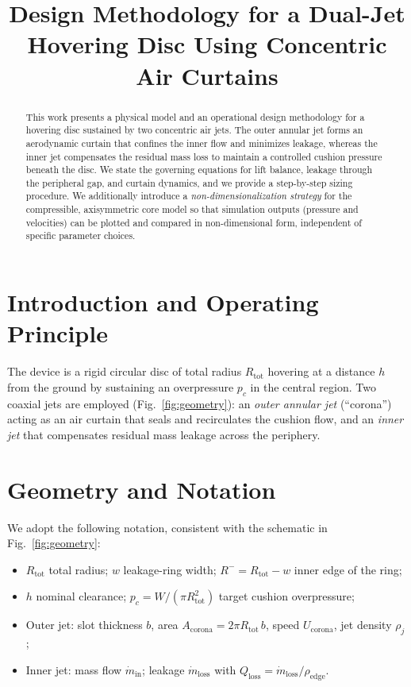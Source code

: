 \documentclass[11pt,a4paper]{article}
\title{Design Methodology for a Dual-Jet Hovering Disc Using Concentric Air Curtains}
\author{ }
\date{ }
\begin{document}
\maketitle

\begin{abstract}
This work presents a physical model and an operational design methodology for a hovering disc sustained by two concentric air jets.
The outer annular jet forms an aerodynamic curtain that confines the inner flow and minimizes leakage, whereas the inner jet compensates the residual mass loss to maintain a controlled cushion pressure beneath the disc. We state the governing equations for lift balance, leakage through the peripheral gap, and curtain dynamics, and we provide a step-by-step sizing procedure. We additionally introduce a \emph{non-dimensionalization strategy} for the compressible, axisymmetric core model so that simulation outputs (pressure and velocities) can be plotted and compared in non-dimensional form, independent of specific parameter choices.
\end{abstract}

\section{Introduction and Operating Principle}
The device is a rigid circular disc of total radius $R_{\text{tot}}$ hovering at a distance $h$ from the ground by sustaining an overpressure $p_c$ in the central region. Two coaxial jets are employed (Fig.~\ref{fig:geometry}): an \emph{outer annular jet} (``corona'') acting as an air curtain that seals and recirculates the cushion flow, and an \emph{inner jet} that compensates residual mass leakage across the periphery.

\section{Geometry and Notation}
We adopt the following notation, consistent with the schematic in Fig.~\ref{fig:geometry}:
\begin{itemize}
  \item $R_{\text{tot}}$ total radius; $w$ leakage-ring width; $R^-=R_{\text{tot}}-w$ inner edge of the ring;
  \item $h$ nominal clearance; $p_c=W/(\pi R_{\text{tot}}^2)$ target cushion overpressure;
  \item Outer jet: slot thickness $b$, area $A_\mathrm{corona}=2\pi R_{\text{tot}}\,b$, speed $U_\mathrm{corona}$, jet density $\rho_j$;
  \item Inner jet: mass flow $\dot m_\mathrm{in}$; leakage $\dot m_\mathrm{loss}$ with $Q_\mathrm{loss}=\dot m_\mathrm{loss}/\rho_\mathrm{edge}$.
\end{itemize}
\end{document}
